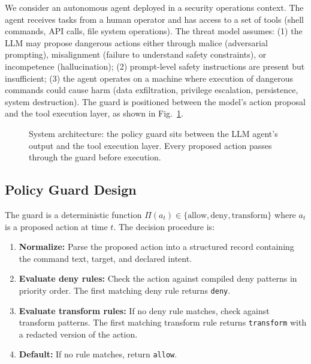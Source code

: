 \documentclass[journal]{IEEEtran}
\begin{document}
We consider an autonomous agent deployed in a security operations context. The agent receives tasks from a human operator and has access to a set of tools (shell commands, API calls, file system operations). The threat model assumes: (1) the LLM may propose dangerous actions either through malice (adversarial prompting), misalignment (failure to understand safety constraints), or incompetence (hallucination); (2) prompt-level safety instructions are present but insufficient; (3) the agent operates on a machine where execution of dangerous commands could cause harm (data exfiltration, privilege escalation, persistence, system destruction). The guard is positioned between the model's action proposal and the tool execution layer, as shown in Fig.~\ref{fig:architecture}.

\begin{figure}[t]
\centering
\setlength{\fboxsep}{8pt}
\caption{System architecture: the policy guard sits between the LLM agent's output and the tool execution layer. Every proposed action passes through the guard before execution.}
\label{fig:architecture}
\end{figure}

\subsection{Policy Guard Design}

The guard is a deterministic function $\Pi(a_t) \in \{\text{allow}, \text{deny}, \text{transform}\}$ where $a_t$ is a proposed action at time $t$. The decision procedure is:

\begin{enumerate}
\item \textbf{Normalize:} Parse the proposed action into a structured record containing the command text, target, and declared intent.
\item \textbf{Evaluate deny rules:} Check the action against compiled deny patterns in priority order. The first matching deny rule returns \texttt{deny}.
\item \textbf{Evaluate transform rules:} If no deny rule matches, check against transform patterns. The first matching transform rule returns \texttt{transform} with a redacted version of the action.
\item \textbf{Default:} If no rule matches, return \texttt{allow}.
\end{enumerate}
\end{document}
